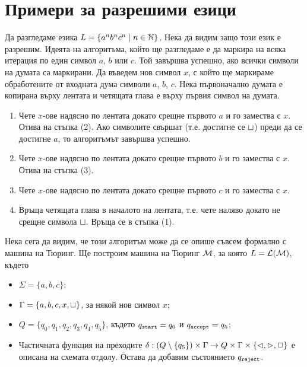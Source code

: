 \section{Примери за разрешими езици}
\label{sect:turing:examples}

\begin{extra}
\begin{example}
  Да разгледаме езика $L = \{a^nb^nc^n \mid n\in\mathbb{N}\}$.
  Нека да видим защо този език е разрешим.
  Идеята на алгоритъма, който ще разгледаме е да маркира на всяка итерация по един символ $a$, $b$ или $c$.
  Той завършва успешно, ако всички символи на думата са маркирани.
  Да въведем нов символ $x$, с който ще маркираме обработените от входната дума символи $a$, $b$, $c$.
  Нека първоначално думата е копирана върху лентата и четящата глава е върху първия символ на думата.
  \begin{enumerate}[(1)]
  \item 
    Чете $x$-ове надясно по лентата докато срещне първото $a$ и го замества с $x$. Отива на стъпка (2).
    Ако символите свършат (т.е. достигне се $\sqcup$) преди да се достигне $a$,
    то алгоритъмът завършва успешно.
  \item
    Чете $x$-ове надясно по лентата докато срещне първото $b$ и го замества с $x$.
    Отива на стъпка (3).
  \item
    Чете $x$-ове надясно по лентата докато срещне първото $c$ и го замества с $x$.
  \item
    Връща четящата глава в началото на лентата, т.е. чете наляво докато не срещне символа $\sqcup$.
    Връща се в стъпка (1). 
  \end{enumerate}

  Нека сега да видим, че този алгоритъм може да се опише съвсем формално с машина на Тюринг.
  Ще построим машина на Тюринг $\mathcal{M}$, за която $L = \mathcal{L}(\mathcal{M})$, където
  \begin{itemize}
  \item 
    $\Sigma = \{a,b,c\}$;
  \item
    $\Gamma = \{a,b,c,x,\sqcup\}$, за някой нов символ $x$;
  \item
    $Q = \{q_0,q_1,q_2,q_3,q_4,q_5\}$, където $q_{\texttt{start}} = q_0$ и $q_{\texttt{accept}} = q_5$;
  \item
    Частичната функция на преходите $\delta:(Q\setminus\{q_5\})\times\Gamma \to Q\times\Gamma\times\{\lhd,\rhd,\Box\}$
    е описана на схемата отдолу. Остава да добавим състоянието $q_{\texttt{reject}}$.
  \end{itemize}


\end{example}
\end{extra}
